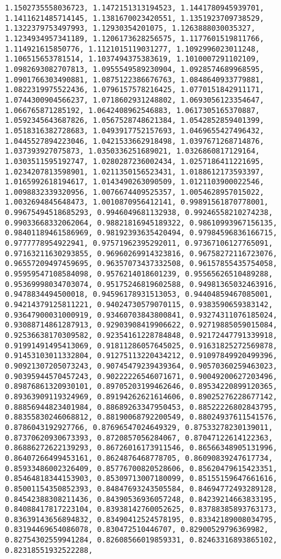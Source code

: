 \documentclass[11pt]{article}
\begin{document}
\begin{Verbatim}[commandchars=\\\{\}]
1.1502735558036723, 1.1472151313194523, 1.1441780945939701, 1.1411621485714145, 1.1381670023420551, 1.1351923709738529, 1.1322379753497993, 1.12930354201075, 1.1263888030035327, 1.1234934957341189, 1.1206173628256575, 1.1177601519811766, 1.114921615850776, 1.1121015119031277, 1.1092996023011248, 1.106515653781514, 1.1037494375383619, 1.1010007291102109, 1.0982693082707813, 1.0955549589230904, 1.0928574689968595, 1.0901766303490881, 1.0875122386676763, 1.0848640933779881, 1.0822319975522436, 1.0796157578216425, 1.0770151842911171, 1.0744300904566237, 1.0718602931248802, 1.0693056123354647, 1.066765871285192, 1.0642408962546883, 1.0617305165370887, 1.0592345643687826, 1.0567528748621384, 1.0542852859401399, 1.0518316382728683, 1.0493917752157693, 1.0469655427496432, 1.0445527894223046, 1.0421533662918498, 1.0397671268714876, 1.037393927075873, 1.0350336251689021, 1.0326860817129164, 1.0303511595192747, 1.0280287236002434, 1.0257186411221695, 1.0234207813598901, 1.0211350156523431, 1.0188612173593397, 1.0165992618194617, 1.0143490263090509, 1.0121103900022546, 1.0098832339320956, 1.0076674409525357, 1.0054628957015022, 1.0032694845648473, 1.0010870956412141, 0.99891561870778001, 0.99675494518685293, 0.9946049681132938, 0.99246558210274238, 0.99033668332062064, 0.98821816945189322, 0.98610993967156135, 0.98401189461586969, 0.98192393635420494, 0.97984596836166715, 0.9777778954922941, 0.97571962395292011, 0.97367106127765091, 0.97163211630293855, 0.96960269914323816, 0.96758272116723076, 0.96557209497459695, 0.96357073437332508, 0.96157855435754058, 0.95959547108584098, 0.9576214018601239, 0.95565626510489288, 0.95369998034703074, 0.95175246819602588, 0.94981365032463916, 0.9478834494500018, 0.94596178931513053, 0.94404859467085001, 0.94214379125811221, 0.94024730579070115, 0.9383590659383142, 0.93647900031000919, 0.93460703843800841, 0.93274311076185024, 0.93088714861287913, 0.92903908419906622, 0.92719885059015084, 0.92536638170309582, 0.92354161228784848, 0.92172447791339918, 0.91991491495413069, 0.91811286057645025, 0.91631825272569878, 0.91453103011332804, 0.91275113220434212, 0.91097849920499396, 0.90921307205073243, 0.90745479239439364, 0.90570360259463023, 0.90395944570457243, 0.90222226546071671, 0.90049200627203496, 0.89876861320930101, 0.89705203199462646, 0.89534220899120365, 0.89363909119324969, 0.89194262621614606, 0.89025276228677142, 0.88856944823401984, 0.88689263347950453, 0.88522226802843795, 0.88355830246068812, 0.88190068792200549, 0.88024937611541576, 0.8786043192927766, 0.87696547024649329, 0.87533278230139011, 0.87370620930673393, 0.8720857056284067, 0.87047122614122363, 0.86886272622139293, 0.86726016173911546, 0.86566348905131996, 0.86407266499453161, 0.8624876468778705, 0.86090839247617734, 0.85933486002326409, 0.85776700820528606, 0.85620479615423351, 0.85464818344153903, 0.85309713007180099, 0.85155159647661616, 0.85001154350852393, 0.84847693243505584, 0.84694772493289128, 0.84542388308211436, 0.84390536936057248, 0.84239214663833195, 0.84088417817223104, 0.83938142760052625, 0.83788385893763173, 0.83639143656894832, 0.83490412524578195, 0.83342189008034795, 0.83194469654086078, 0.830472510446707, 0.82900529796369982, 0.82754302559941284, 0.82608566019859331, 0.82463316893865102, 0.82318551932522288, 
\end{Verbatim}
\end{document}
